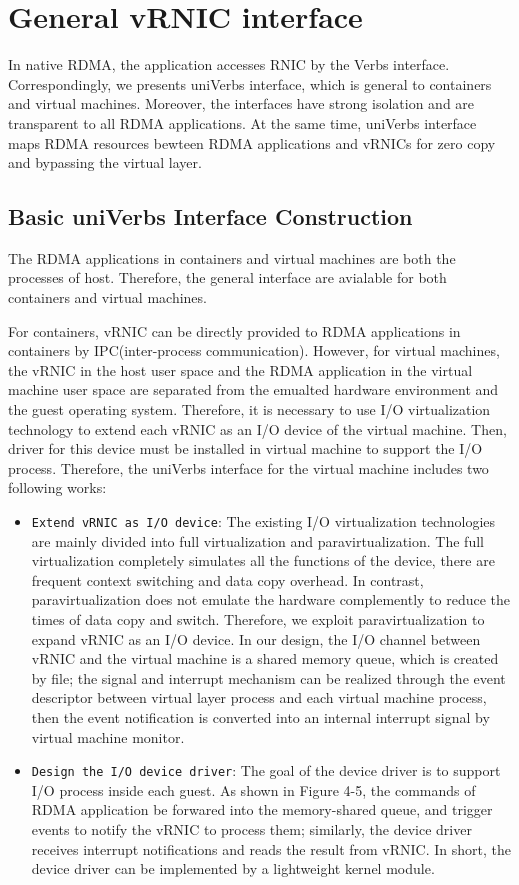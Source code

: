 \documentclass[sigplan,screen]{acmart}
\begin{document}
\section{General vRNIC interface}
In native RDMA, the application accesses RNIC by the Verbs interface. Correspondingly, we presents uniVerbs interface, which is general to containers and virtual machines. Moreover, the interfaces have strong isolation and are transparent to all RDMA applications. At the same time, uniVerbs interface maps RDMA resources bewteen RDMA applications and vRNICs for zero copy and bypassing the virtual layer.
	
\subsection{Basic uniVerbs Interface Construction}
The RDMA applications in containers and virtual machines are both the processes of host. Therefore, the general interface are avialable for both containers and virtual machines. 

For containers, vRNIC can be directly provided to RDMA applications in containers by IPC(inter-process communication). However, for virtual machines, the vRNIC in the host user space and the RDMA application in the virtual machine user space are separated from the emualted hardware environment and the guest operating system. Therefore, it is necessary to use I/O virtualization technology to extend each vRNIC as an I/O device of the virtual machine. Then, driver for this device must be installed in virtual machine to support the I/O process. Therefore, the uniVerbs interface for the virtual machine includes two following works:

\begin{itemize}
\item {\verb|Extend vRNIC as I/O device|}: 
The existing I/O virtualization technologies are mainly divided into full virtualization and paravirtualization. The full virtualization completely simulates all the functions of the device, there are frequent context switching and data copy overhead. 
In contrast, paravirtualization does not emulate the hardware complemently to reduce the times of data copy and switch. Therefore, we exploit paravirtualization to expand vRNIC as an I/O device. In our design, the I/O channel between vRNIC and the virtual machine is a shared memory queue, which is created by file; the signal and interrupt mechanism can be realized through the event descriptor between virtual layer process and each virtual machine process, then the event notification is converted into an internal interrupt signal by virtual machine monitor.
  
\item {\verb|Design the I/O device driver|}:
The goal of the device driver is to support I/O process inside each guest. As shown in Figure 4-5,  the commands of RDMA application be forwared into the memory-shared queue, and trigger events to notify the vRNIC to process them; similarly, the device driver receives interrupt notifications and reads the result from vRNIC. In short, the device driver can be implemented by a lightweight kernel module.

\end{itemize}
\end{document}
